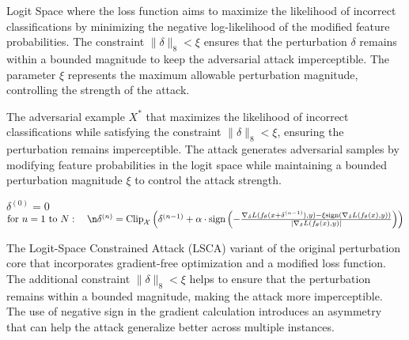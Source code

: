 Logit Space where the loss function aims to maximize the likelihood of incorrect classifications by minimizing the negative log-likelihood of the modified feature probabilities. The constraint $\| \delta \|_8 < \xi$ ensures that the perturbation $\delta$ remains within a bounded magnitude to keep the adversarial attack imperceptible. The parameter $\xi$ represents the maximum allowable perturbation magnitude, controlling the strength of the attack.

The adversarial example $X^*$ that maximizes the likelihood of incorrect classifications while satisfying the constraint $\| \delta \|_8 < \xi$, ensuring the perturbation remains imperceptible. The attack generates adversarial samples by modifying feature probabilities in the logit space while maintaining a bounded perturbation magnitude $\xi$ to control the attack strength.

$\delta^{(0)} = 0$
$\text{for } n = 1 \text{ to } N: \quad\n\delta^{(n)} = \text{Clip}_{\mathcal{X}} \left( \delta^{(n-1)} + \alpha \cdot \text{sign} \left( -\frac{\nabla_\delta L(f_\theta(x + \delta^{(n-1)}), y) - \xi \text{sign}(\nabla_\delta L(f_\theta(x), y))}{|\nabla_\delta L(f_\theta(x), y)|} \right) \right)$

The Logit-Space Constrained Attack (LSCA) variant of the original perturbation core that incorporates gradient-free optimization and a modified loss function. The additional constraint $\| \delta \|_8 < \xi$ helps to ensure that the perturbation remains within a bounded magnitude, making the attack more imperceptible. The use of negative sign in the gradient calculation introduces an asymmetry that can help the attack generalize better across multiple instances.